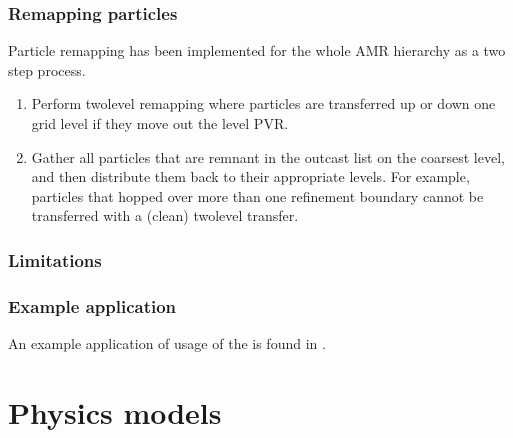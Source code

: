 \documentclass[letterpaper,10pt,english]{sphinxmanual}
\begin{document}
\subsection{Remapping particles}
\label{\detokenize{Solvers/Ito:remapping-particles}}
\sphinxAtStartPar
Particle remapping has been implemented for the whole AMR hierarchy as a two step process.
\begin{enumerate}
%
\item {} 
\sphinxAtStartPar
Perform two\sphinxhyphen{}level remapping where particles are transferred up or down one grid level if they move out the level PVR.

\item {} 
\sphinxAtStartPar
Gather all particles that are remnant in the outcast list on the coarsest level, and then distribute them back to their appropriate levels. For example, particles that hopped over more than one refinement boundary cannot be transferred with a (clean) two\sphinxhyphen{}level transfer.

\end{enumerate}


\subsection{Limitations}
\label{\detokenize{Solvers/Ito:limitations}}

\subsection{Example application}
\label{\detokenize{Solvers/Ito:example-application}}
\sphinxAtStartPar
An example application of usage of the  is found in {\hyperref[\detokenize{Applications/BrownianWalkerModel:chap-brownianwalkermodel}]{}}.


\chapter{Physics models}
\label{\detokenize{index:physics-models}}
\sphinxstepscope
\end{document}
